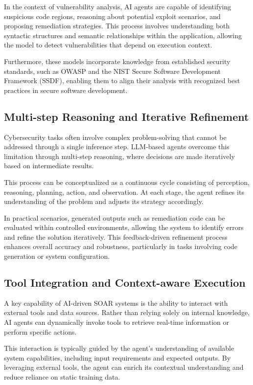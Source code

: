\documentclass[12pt]{report}
\begin{document}
In the context of vulnerability analysis, AI agents are capable of identifying suspicious code regions, reasoning about potential exploit scenarios, and proposing remediation strategies. This process involves understanding both syntactic structures and semantic relationships within the application, allowing the model to detect vulnerabilities that depend on execution context.

Furthermore, these models incorporate knowledge from established security standards, such as OWASP and the NIST Secure Software Development Framework (SSDF), enabling them to align their analysis with recognized best practices in secure software development.

\subsection{Multi-step Reasoning and Iterative Refinement}

Cybersecurity tasks often involve complex problem-solving that cannot be addressed through a single inference step. LLM-based agents overcome this limitation through multi-step reasoning, where decisions are made iteratively based on intermediate results.

This process can be conceptualized as a continuous cycle consisting of perception, reasoning, planning, action, and observation. At each stage, the agent refines its understanding of the problem and adjusts its strategy accordingly.

In practical scenarios, generated outputs such as remediation code can be evaluated within controlled environments, allowing the system to identify errors and refine the solution iteratively. This feedback-driven refinement process enhances overall accuracy and robustness, particularly in tasks involving code generation or system configuration.

\subsection{Tool Integration and Context-aware Execution}

A key capability of AI-driven SOAR systems is the ability to interact with external tools and data sources. Rather than relying solely on internal knowledge, AI agents can dynamically invoke tools to retrieve real-time information or perform specific actions.

This interaction is typically guided by the agent’s understanding of available system capabilities, including input requirements and expected outputs. By leveraging external tools, the agent can enrich its contextual understanding and reduce reliance on static training data.
\end{document}
